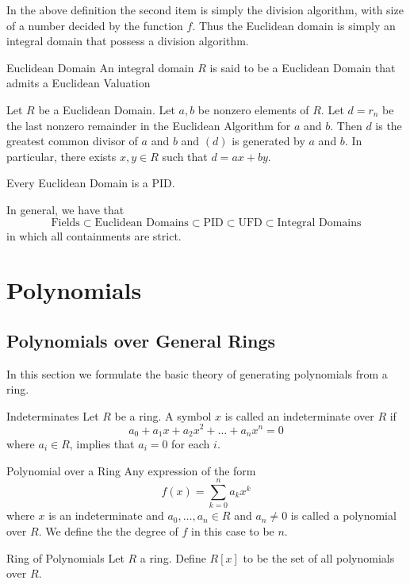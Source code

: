 \documentclass[a4paper]{article}
\begin{document}
In the above definition the second item is simply the division algorithm, with size of a number decided by the function $f$. Thus the Euclidean domain is simply an integral domain that possess a division algorithm. 

\begin{defn}{Euclidean Domain}{} An integral domain $R$ is said to be a Euclidean Domain that admits a Euclidean Valuation
\end{defn}

\begin{thm}{}{} Let $R$ be a Euclidean Domain. Let $a,b$ be nonzero elements of $R$. Let $d=r_n$ be the last nonzero remainder in the Euclidean Algorithm for $a$ and $b$. Then $d$ is the greatest common divisor of $a$ and $b$ and $(d)$ is generated by $a$ and $b$. In particular, there exists $x,y\in R$ such that $d=ax+by$. 
\end{thm}

\begin{prp}{}{} Every Euclidean Domain is a PID. 
\end{prp}

In general, we have that $$\text{Fields}\subset\text{Euclidean Domains}\subset\text{PID}\subset\text{UFD}\subset\text{Integral Domains}$$ in which all containments are strict. 

\pagebreak
\section{Polynomials}
\subsection{Polynomials over General Rings}
In this section we formulate the basic theory of generating polynomials from a ring. 
\begin{defn}{Indeterminates}{} Let $R$ be a ring. A symbol $x$ is called an indeterminate over $R$ if $$a_0+a_1x+a_2x^2+\dots+a_nx^n=0$$ where $a_i\in R$, implies that $a_i=0$ for each $i$. 
\end{defn}

\begin{defn}{Polynomial over a Ring}{} Any expression of the form $$f(x)=\sum_{k=0}^na_kx^k$$ where $x$ is an indeterminate and $a_0,\dots,a_n\in R$ and $a_n\neq 0$ is called a polynomial over $R$. We define the the degree of $f$ in this case to be $n$. 
\end{defn}

\begin{defn}{Ring of Polynomials}{} Let $R$ a ring. Define $R[x]$ to be the set of all polynomials over $R$. 
\end{defn}
\end{document}
